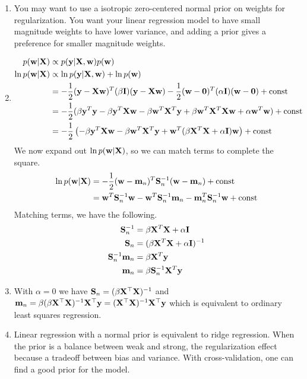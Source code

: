 \documentclass[submit]{harvardml}
\begin{document}
\begin{solution}
\begin{sol}
\begin{enumerate}
%
\item
You may want to use a isotropic zero-centered normal prior on weights for regularization.
You want your linear regression model to have small magnitude weights to have lower variance, and adding a prior gives a preference for smaller magnitude weights.
%
\item
\begin{align*}
p(\mathbf{w} | \mathbf{X}) &\propto p(\mathbf{y} | \mathbf{X}, \mathbf{w}) p(\mathbf{w})\\
\ln p(\mathbf{w} | \mathbf{X}) &\propto \ln p(\mathbf{y} | \mathbf{X}, \mathbf{w}) + \ln p(\mathbf{w})\\
&= -\frac12 (\mathbf{y} - \mathbf{X}\mathbf{w})^T (\beta \mathbf{I}) (\mathbf{y} - \mathbf{X}\mathbf{w}) -\frac12(\mathbf{w} - \bold0)^T (\alpha \mathbf{I}) (\mathbf{w} - \bold0) + \textrm{const}\\
&= -\frac12 (\beta \mathbf{y}^T \mathbf{y} - \beta \mathbf{y}^T \mathbf{X} \mathbf{w} - \beta \mathbf{w}^T \mathbf{X}^T \mathbf{y} + \beta \mathbf{w}^T \mathbf{X}^T \mathbf{X} \mathbf{w} + \alpha \mathbf{w}^T \mathbf{w}) + \textrm{const}\\
&= -\frac12 \left(- \beta \mathbf{y}^T \mathbf{X} \mathbf{w} - \beta \mathbf{w}^T \mathbf{X}^T \mathbf{y} + \mathbf{w}^T (\beta \mathbf{X}^T \mathbf{X} + \alpha \mathbf{I}) \mathbf{w} \right) + \textrm{const}
\end{align*}
We now expand out $\ln p(\mathbf{w} | \mathbf{X})$, so we can match terms to complete the square.
\begin{align*}
\ln p(\mathbf{w} | \mathbf{X}) &= -\frac12 (\mathbf{w} - \mathbf{m}_n)^T \mathbf{S}_n^{-1} (\mathbf{w} - \mathbf{m}_n) + \textrm{const} \\
&= \mathbf{w}^T \mathbf{S}_n^{-1} \mathbf{w} - \mathbf{w}^T \mathbf{S}_n^{-1} \mathbf{m}_n - \mathbf{m}_n^T \mathbf{S}_n^{-1} \mathbf{w} + \textrm{const}
\end{align*}
Matching terms, we have the following.
\begin{align*}
\mathbf{S}_n^{-1} &= \beta \mathbf{X}^T \mathbf{X} + \alpha \mathbf{I}\\
\mathbf{S}_n &= (\beta \mathbf{X}^T \mathbf{X} + \alpha \mathbf{I})^{-1}\\
\mathbf{S}_n^{-1} \mathbf{m}_n &= \beta \mathbf{X}^T \mathbf{y}\\
\mathbf{m}_n &= \beta \mathbf{S}_n^{-1} \mathbf{X}^T \mathbf{y}
\end{align*}
%
\item
With $\alpha = 0$ we have $\mathbf{S}_n = (\beta\mathbf{X}^\top\mathbf{X})^{-1}$ and
$\mathbf{m}_n =\beta(\beta\mathbf{X}^\top\mathbf{X})^{-1}\mathbf{X}^\top\mathbf{y} = (\mathbf{X}^\top\mathbf{X})^{-1}\mathbf{X}^\top\mathbf{y}$
which is equivalent to ordinary least squares regression.
%
\item
Linear regression with a normal prior is equivalent to ridge regression.
When the prior is a balance between weak and strong, the regularization effect because a tradeoff between bias and variance.
With cross-validation, one can find a good prior for the model.


\end{enumerate}
\end{sol}
\end{solution}
\end{document}
